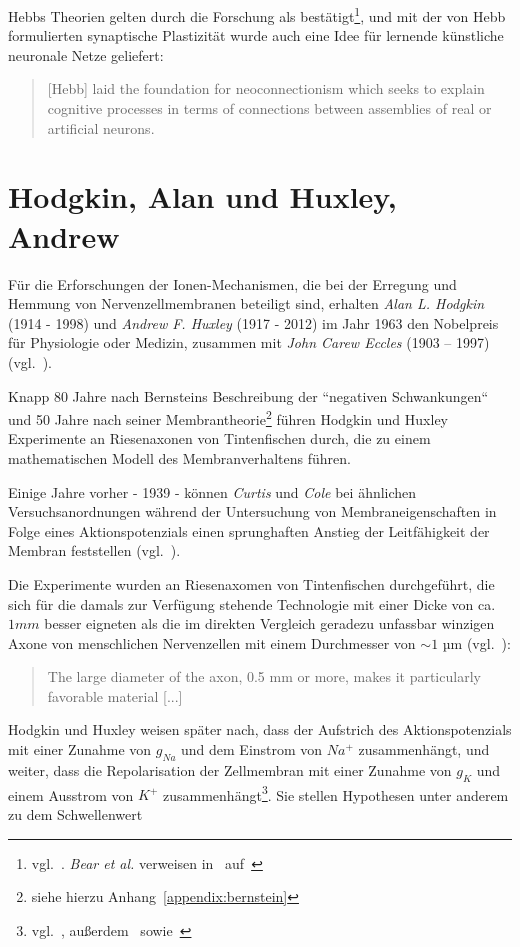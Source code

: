 Hebbs Theorien gelten durch die Forschung als bestätigt\footnote{
vgl.~\cite[833]{Flo19}. \textit{Bear et al.} verweisen in~\cite[875, Exkurs 23.5]{BCP18} auf~\cite{CL78}
}, und mit der von Hebb formulierten synaptische Plastizität wurde auch eine Idee für lernende künstliche neuronale Netze geliefert:

\blockquote[{\cite[2]{Kle99}}]{
    [Hebb] laid the foundation for neoconnectionism which seeks to explain cognitive processes in terms of connections between assemblies of real or artificial neurons.
}



\section{Hodgkin, Alan und Huxley, Andrew}\label{appendix:hodgkinhuxley}

Für die Erforschungen der Ionen-Mechanismen, die bei der Erregung und Hemmung von Nervenzellmembranen beteiligt sind, erhalten \textit{Alan L. Hodgkin} (1914 - 1998) und \textit{Andrew F. Huxley} (1917 - 2012) im Jahr 1963 den Nobelpreis für Physiologie oder Medizin, zusammen mit \textit{John Carew Eccles} (1903 – 1997) (vgl.~\cite{Gle09}).

Knapp 80 Jahre nach Bernsteins Beschreibung der ``negativen Schwankungen`` und 50 Jahre nach seiner Membrantheorie\footnote{
siehe hierzu Anhang~\ref{appendix:bernstein}
} führen Hodgkin und Huxley Experimente an Riesenaxonen von Tintenfischen durch, die zu einem mathematischen Modell des Membranverhaltens führen.

Einige Jahre vorher - 1939 - können \textit{Curtis} und \textit{Cole} bei ähnlichen Versuchsanordnungen während der Untersuchung von Membraneigenschaften in Folge eines Aktionspotenzials einen sprunghaften Anstieg der Leitfähigkeit der Membran feststellen (vgl.~\cite[669]{CC39}).

Die Experimente wurden an Riesenaxomen von Tintenfischen durchgeführt, die sich für die damals zur Verfügung stehende Technologie mit einer Dicke von ca. $1 mm$ besser eigneten als die im direkten Vergleich geradezu unfassbar winzigen Axone von menschlichen Nervenzellen mit einem Durchmesser von $\sim1$ µm (vgl.~\cite[79]{Jon19}):

\blockquote[{\cite[650]{CC39}}]{
    The large diameter of the axon, 0.5 mm or more, makes it particularly favorable material {[...]}
}

Hodgkin und Huxley weisen später nach, dass der Aufstrich des Aktionspotenzials mit einer Zunahme von $g_{Na}$ und dem Einstrom von $Na^+$ zusammenhängt, und weiter, dass die Repolarisation der Zellmembran mit einer Zunahme von $g_K$ und einem Ausstrom von $K^+$ zusammenhängt\footnote{
    vgl.~\cite[75]{Jon19}, außerdem~\cite[96]{BCP18} sowie~\cite[530 Fig. 17]{HH52}
}.
Sie stellen Hypothesen unter anderem zu dem Schwellenwert

